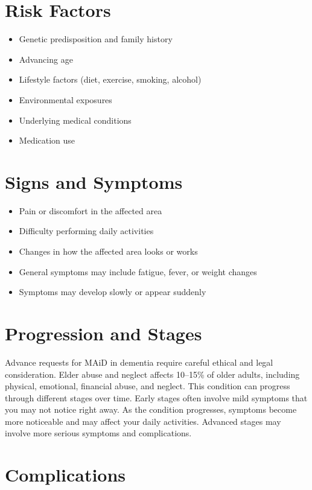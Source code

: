 \section{Risk Factors}

\begin{itemize}[noitemsep]
  \item Genetic predisposition and family history
  \item Advancing age
  \item Lifestyle factors (diet, exercise, smoking, alcohol)
  \item Environmental exposures
  \item Underlying medical conditions
  \item Medication use
\end{itemize}

\section{Signs and Symptoms}

\begin{itemize}[noitemsep]
  \item Pain or discomfort in the affected area
  \item Difficulty performing daily activities
  \item Changes in how the affected area looks or works
  \item General symptoms may include fatigue, fever, or weight changes
  \item Symptoms may develop slowly or appear suddenly
\end{itemize}

\section{Progression and Stages}
Advance requests for MAiD in dementia require careful ethical and legal consideration.
Elder abuse and neglect affects 10--15\% of older adults, including physical, emotional, financial abuse, and neglect. This condition can progress through different stages over time. Early stages often involve mild symptoms that you may not notice right away. As the condition progresses, symptoms become more noticeable and may affect your daily activities. Advanced stages may involve more serious symptoms and complications.

\section{Complications}


